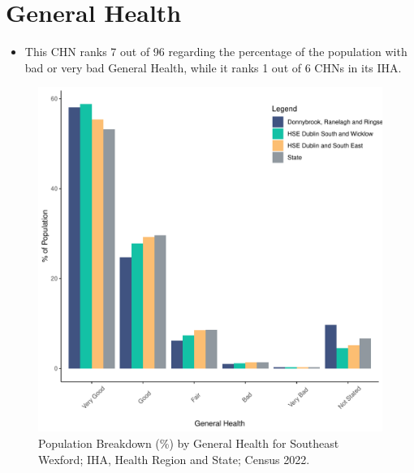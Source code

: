 \documentclass{article}
\begin{document}
\pagebreak

\section{General Health}\label{sect:GenHealth}
\begin{itemize}
\item  This CHN ranks  7 out of 96 regarding the percentage of the population with bad or very bad General Health, while it ranks   1 out of 6 CHNs in its IHA.
\end{itemize}
\begin{figure}[h]
	\centering
	\includegraphics[width = 150mm]{../figures/GenED.pdf}
	\caption{Population Breakdown (\%) by General Health for Southeast Wexford; IHA, Health Region and State;  Census 2022.}
	\label{fig:2ae19629-1a6a-13a3-e055-000000000001}
	\end{figure}
\end{document}
